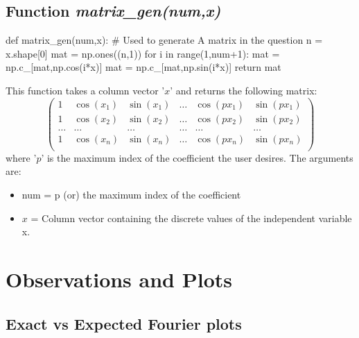 \documentclass[12pt, a4paper]{article}
\begin{document}
\subsection{Function \textit{matrix\_gen(num,x)}}
\begin{py_code}
    def matrix_gen(num,x):
        # Used to generate A matrix in the question
        n = x.shape[0]
        mat = np.ones((n,1))
        for i in range(1,num+1):
            mat = np.c_[mat,np.cos(i*x)]
            mat = np.c_[mat,np.sin(i*x)]
        return mat
\end{py_code}
This function takes a column vector '$x$' and returns the following matrix:
\begin{equation*}
    \begin{pmatrix}
        1 & \cos(x_{1}) & \sin(x_{1}) & \ldots & \cos(px_{1}) & \sin(px_{1}) \\
        1 & \cos(x_{2}) & \sin(x_{2}) & \ldots & \cos(px_{2}) & \sin(px_{2}) \\
        \ldots & \ldots & \ldots & \ldots & \ldots & \ldots \\
        1 & \cos(x_{n}) & \sin(x_{n}) & \ldots & \cos(px_{n}) & \sin(px_{n}) \\
    \end{pmatrix}
\end{equation*}
where '$p$' is the maximum index of the coefficient the user desires. The arguments are:
\vspace{-0.5cm}
\begin{itemize}
    \item num = p (or) the maximum index of the coefficient
    \item $x$ = Column vector containing the discrete values of the independent variable x.
\end{itemize}

\section{Observations and Plots}
\vspace{-0.5cm}
\subsection{Exact vs Expected Fourier plots}
\vspace{-0.3cm}
\end{document}
